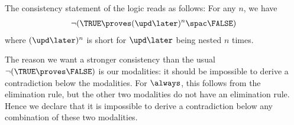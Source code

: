 The consistency statement of the logic reads as follows: For any $n$, we have
\begin{align*}
  \lnot(\TRUE \proves (\upd\later)^n\spac\FALSE)
\end{align*}
where $(\upd\later)^n$ is short for $\upd\later$ being nested $n$ times.

The reason we want a stronger consistency than the usual $\lnot(\TRUE \proves \FALSE)$ is our modalities: it should be impossible to derive a contradiction below the modalities.
For $\always$, this follows from the elimination rule, but the other two modalities do not have an elimination rule.
Hence we declare that it is impossible to derive a contradiction below any combination of these two modalities.


